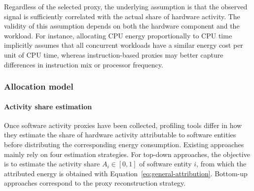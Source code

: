 \documentclass[
  acmsmall,
  screen,
  review,
  xcolor={dvipsnames,usenames}
]{acmart}
\begin{document}
Regardless of the selected proxy, the underlying assumption is that the observed signal is sufficiently correlated with the actual share of hardware activity. The validity of this assumption depends on both the hardware component and the workload. For instance, allocating CPU energy proportionally to CPU time implicitly assumes that all concurrent workloads have a similar energy cost per unit of CPU time, whereas instruction-based proxies may better capture differences in instruction mix or processor frequency.

\subsubsection{\textbf{Allocation model}}

\paragraph{\textbf{Activity share estimation}}

Once software activity proxies have been collected, profiling tools differ in how they estimate the share of hardware activity attributable to software entities before distributing the corresponding energy consumption. Existing approaches mainly rely on four estimation strategies. For top-down approaches, the objective is to estimate the activity share $A_i \in [0,1]$ of software entity $i$, from which the attributed energy is obtained with Equation~\ref{eq:general-attribution}. Bottom-up approaches correspond to the proxy reconstruction strategy.
\end{document}
